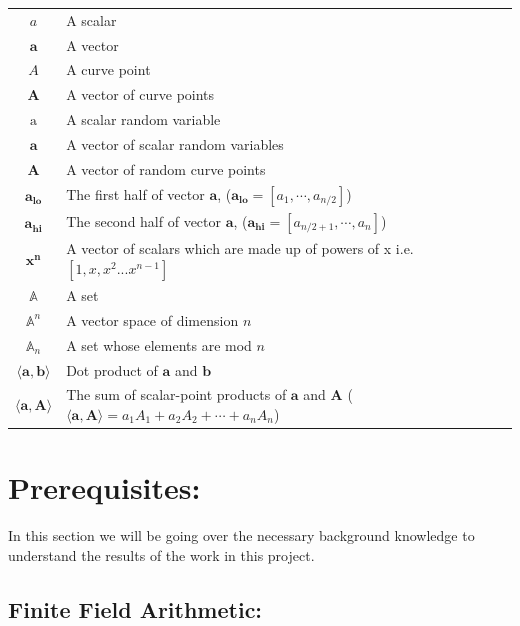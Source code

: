 \documentclass{article}
\renewcommand{\vec}[1]{\boldsymbol{#1}}
\newcommand{\ran}[1]{\mathrm{#1}}
\newcommand{\vecran}[1]{\mathbf{#1}}
\newcommand{\dotp}[2]{\langle #1, #2 \rangle}
\newcommand{\opn}[1]{\operatorname{#1}}
\newcommand{\veclo}[1]{\vec{#1_{\opn{lo}}}}
\newcommand{\vechi}[1]{\vec{#1_{\opn{hi}}}}
\begin{document}
\begin{center}
\begin{tabular}{ c l }
	$a$                       & A scalar \\
	$\vec{a}$                 & A vector \\
	$A$                       & A curve point \\
	$\vec{A}$                 & A vector of curve points \\
	$\ran{a}$                 & A scalar random variable \\
	$\vecran{a}$              & A vector of scalar random variables \\
	$\vecran{A}$              & A vector of random curve points \\
	$\veclo{a}$               & The first half of vector $\vec{a}$, ($\veclo{a} = [a_{1}, \cdots, a_{n/2}]$) \\
	$\vechi{a}$               & The second half of vector $\vec{a}$, ($\vechi{a} = [a_{n/2+1}, \cdots, a_{n}]$) \\
	$\vec{x^n}$ 			  & A vector of scalars which are made up of
								powers of x i.e. $[1,x,x^2... x^{n-1}]$\\
	$\mathbb{A}$              & A set \\
	$\mathbb{A}^n$            & A vector space of dimension $n$ \\ 
	$\mathbb{A}_n$            & A set whose elements are mod $n$ \\ 
	$\dotp{\vec{a}}{\vec{b}}$ & Dot product of $\vec{a}$ and $\vec{b}$ \\
	$\dotp{\vec{a}}{\vec{A}}$ & The sum of scalar-point products of $\vec{a}$ and $\vec{A}$ ($\dotp{\vec{a}}{\vec{A}} = a_1 A_1 + a_2 A_2 + \cdots + a_n A_n$) \\
\end{tabular}
\end{center}

\section{Prerequisites:}

In this section we will be going over the necessary background knowledge
to understand the results of the work in this project.

\subsection{Finite Field Arithmetic:} \label{Finite Field Arithmetic}
\end{document}

